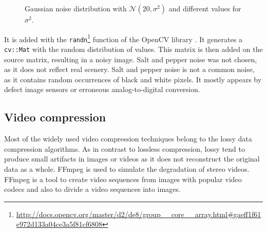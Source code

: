 
\begin{figure}[h!]
  \center
  \label{fig:gaussian}
  \caption{Gaussian noise distribution with $\mathcal{N}(20,\sigma^2)$ and different values for $\sigma^2$.}
\end{figure}

\noindent It is added with the \texttt{randn}\footnote{\url{http://docs.opencv.org/master/d2/de8/group__core__array.html\#gaeff1f61e972d133a04ce3a5f81cf6808}} function of the OpenCV library \citep{opencv_library}.
It generates a \texttt{cv::Mat} with the random distribution of values.
This matrix is then added on the source matrix, resulting in a noisy image.
Salt and pepper noise was not chosen, as it does not reflect real scenery.
Salt and pepper noise is not a common noise, as it contains random occurrences of black and white pixels.
It mostly appears by defect image sensors or erroneous analog-to-digital conversion.

\subsection*{Video compression}

Most of the widely used video compression techniques belong to the lossy data compression algorithms.
As in contrast to lossless compression, lossy tend to produce small artifacts in images or videos as it does not reconstruct the original data as a whole.
FFmpeg \citep{FFMPEG2010} is used to simulate the degradation of stereo videos.
FFmpeg is a tool to create video sequences from images with popular video codecs and also to divide a video sequences into images.


